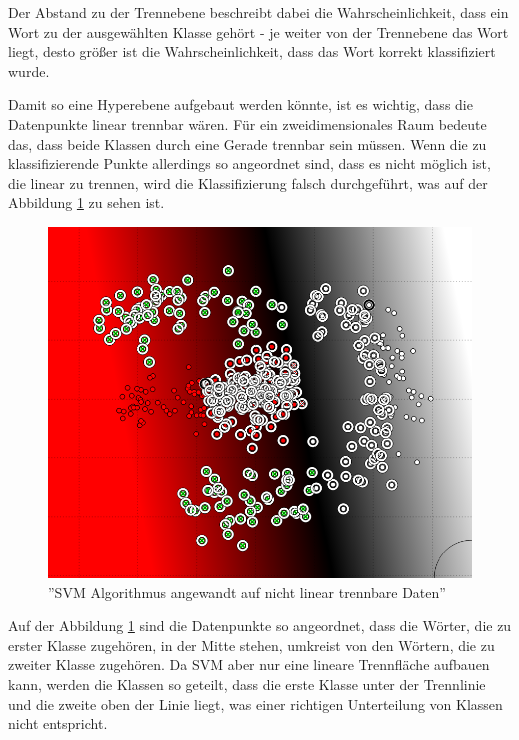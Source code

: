 Der Abstand zu der Trennebene beschreibt dabei die Wahrscheinlichkeit, dass ein Wort zu der ausgewählten Klasse gehört - je weiter von der Trennebene das Wort liegt, desto größer ist die Wahrscheinlichkeit, dass das Wort korrekt klassifiziert wurde.

Damit so eine Hyperebene aufgebaut werden könnte, ist es wichtig, dass die Datenpunkte linear trennbar wären. Für ein zweidimensionales Raum bedeute das, dass beide Klassen durch eine Gerade trennbar sein müssen. Wenn die zu klassifizierende Punkte allerdings so angeordnet sind, dass es nicht möglich ist, die linear zu trennen, wird die Klassifizierung falsch durchgeführt, was auf der Abbildung \ref{fig:SVM-NONLINEAR-ISSUE} zu sehen ist.

\begin{figure}
\centering
\includegraphics[width=\textwidth,angle=90]{Bilder/svm-nonlinear-issue.png}
\caption{''SVM Algorithmus angewandt auf nicht linear trennbare Daten''}
\label{fig:SVM-NONLINEAR-ISSUE}
\end{figure}

Auf der Abbildung \ref{fig:SVM-NONLINEAR-ISSUE} sind die Datenpunkte so angeordnet, dass die Wörter, die zu erster Klasse zugehören, in der Mitte stehen, umkreist von den Wörtern, die zu zweiter Klasse zugehören. Da SVM aber nur eine lineare Trennfläche aufbauen kann, werden die Klassen so geteilt, dass die erste Klasse unter der Trennlinie und die zweite oben der Linie liegt, was einer richtigen Unterteilung von Klassen nicht entspricht.

